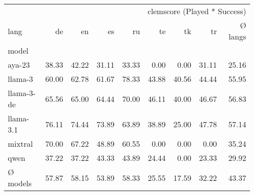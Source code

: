 \begin{tabular}{lrrrrrrrr}
\toprule
 & \multicolumn{8}{r}{clemscore (Played * Success)} \\
lang & de & en & es & ru & te & tk & tr & Ø langs \\
model &  &  &  &  &  &  &  &  \\
\midrule
aya-23 & 38.33 & 42.22 & 31.11 & 33.33 & 0.00 & 0.00 & 31.11 & 25.16 \\
llama-3 & 60.00 & 62.78 & 61.67 & 78.33 & 43.88 & 40.56 & 44.44 & 55.95 \\
llama-3-de & 65.56 & 65.00 & 64.44 & 70.00 & 46.11 & 40.00 & 46.67 & 56.83 \\
llama-3.1 & 76.11 & 74.44 & 73.89 & 63.89 & 38.89 & 25.00 & 47.78 & 57.14 \\
mixtral & 70.00 & 67.22 & 48.89 & 60.55 & 0.00 & 0.00 & 0.00 & 35.24 \\
qwen & 37.22 & 37.22 & 43.33 & 43.89 & 24.44 & 0.00 & 23.33 & 29.92 \\
Ø models & 57.87 & 58.15 & 53.89 & 58.33 & 25.55 & 17.59 & 32.22 & 43.37 \\
\bottomrule
\end{tabular}
